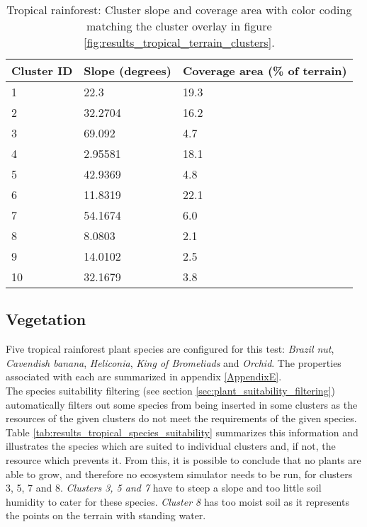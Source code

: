 \begin{table}[h]
  \centering
	    \begin{tabular}{|p{5cm}|p{5cm}|p{5cm}|}
		\hline	
  	    \textbf{Cluster ID} & \textbf{Slope (degrees)} & \textbf{Coverage area (\% of terrain)} \\
  	    \hline	
		\cellcolor{trop_cluster_1} 1 & 22.3 & 19.3 \\
		\hline
		\cellcolor{trop_cluster_2} 2 & 32.2704 & 16.2 \\
		\hline
		\cellcolor{trop_cluster_3} 3 & 69.092 & 4.7 \\
		\hline
		\cellcolor{trop_cluster_4}4 & 2.95581 & 18.1 \\
		\hline
		\cellcolor{trop_cluster_5} 5 & 42.9369 & 4.8 \\
		\hline
		\cellcolor{trop_cluster_6} 6 & 11.8319 & 22.1 \\
		\hline
		\cellcolor{trop_cluster_7} 7 & 54.1674 & 6.0 \\
		\hline
		\cellcolor{trop_cluster_8} 8 & 8.0803 & 2.1 \\
		\hline
		\cellcolor{trop_cluster_9} 9 & 14.0102 & 2.5 \\
		\hline
		\cellcolor{trop_cluster_10} 10 & 32.1679 & 3.8 \\
		\hline
		\end{tabular}
		\caption{Tropical rainforest: Cluster slope and coverage area with color coding matching the cluster overlay in figure \ref{fig:results_tropical_terrain_clusters}.}
	  \label{tab:results_tropical_cluster_slope_covarea}
\end{table}

\subsection{Vegetation}

Five tropical rainforest plant species are configured for this test: \textit{Brazil nut}, \textit{Cavendish banana}, \textit{Heliconia}, \textit{King of Bromeliads} and \textit{Orchid}. The properties associated with each are summarized in appendix \ref{AppendixE}.\\

The species suitability filtering (see section \ref{sec:plant_suitability_filtering}) automatically filters out some species from being inserted in some clusters as the resources of the given clusters do not meet the requirements of the given species. Table \ref{tab:results_tropical_species_suitability} summarizes this information and illustrates the species which are suited to individual clusters and, if not, the resource which prevents it. From this, it is possible to conclude that no plants are able to grow, and therefore no ecosystem simulator needs to be run, for clusters 3, 5, 7 and 8. \textit{Clusters 3, 5 and 7} have to steep a slope and too little soil humidity to cater for these species. \textit{Cluster 8} has too moist soil as it represents the points on the terrain with standing water.\\

